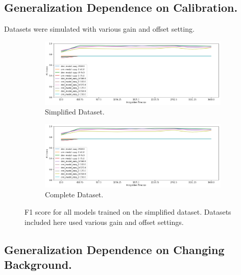 \subsection{Generalization Dependence on Calibration.}

Datasets were simulated with various gain and offset setting.

\begin{figure}[H]
     \centering
     \begin{subfigure}[b]{0.9\textwidth}
         \centering
         \includegraphics[width=\textwidth]{images/results_easy_distance_comparison}
         \caption{Simplified Dataset.}
         \label{fig:results_easy_distance_comparison_simple}
     \end{subfigure}

     \begin{subfigure}[b]{0.9\textwidth}
         \centering
         \includegraphics[width=\textwidth]{images/results_easy_distance_comparison}
         \caption{Complete Dataset.}
         \label{fig:results_easy_distance_comparison_full}
     \end{subfigure}
        \caption{F1 score for all models trained on the simplified dataset. Datasets included here used various gain and offset settings.}
        \label{fig:results_easy_distance_comparison}
\end{figure}



\subsection{Generalization Dependence on Changing Background.}

